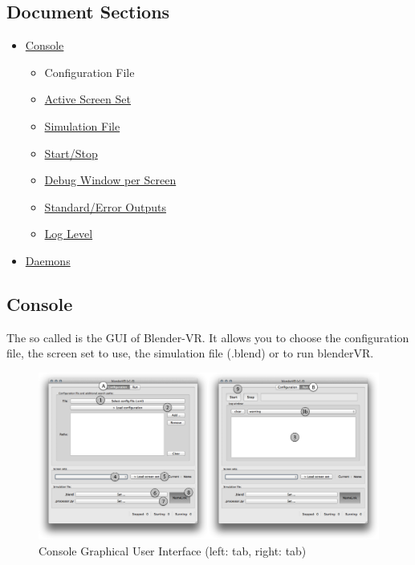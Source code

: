\documentclass[a4,10pt,openany,oneside]{sphinxmanual}
\begin{document}
\subsection{Document Sections}
\label{components/user-interface:document-sections}\begin{itemize}
\item {} 
{\hyperref[components/user-interface:console]{Console}}
\begin{itemize}
\item {} 
Configuration File

\item {} 
{\hyperref[components/user-interface:active-screen-set]{Active Screen Set}}

\item {} 
{\hyperref[components/user-interface:simulation-file]{Simulation File}}

\item {} 
{\hyperref[components/user-interface:start-stop]{Start/Stop}}

\item {} 
{\hyperref[components/user-interface:debug-window-per-screen]{Debug Window per Screen}}

\item {} 
{\hyperref[components/user-interface:standard-error-outputs]{Standard/Error Outputs}}

\item {} 
{\hyperref[components/user-interface:log-level]{Log Level}}

\end{itemize}

\item {} 
{\hyperref[components/user-interface:daemons]{Daemons}}

\end{itemize}


\subsection{Console}
\label{components/user-interface:console}
The so called  is the GUI of Blender-VR. It allows you to choose the configuration file, the screen set to use, the simulation file (.blend) or to run blenderVR.
\begin{figure}[htbp]
\centering
\capstart

\includegraphics{user-interface-1and2.png}
\caption{Console Graphical User Interface (left:  tab, right:  tab)}\end{figure}
\end{document}

